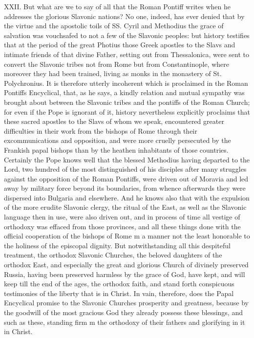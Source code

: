 XXII. But what are we to say of all that the Roman Pontiff writes when
he addresses the glorious Slavonic nations? No one, indeed, has ever
denied that by the virtue and the apostolic toils of SS. Cyril and
Methodius the grace of salvation was vouchsafed to not a few of the
Slavonic peoples: but history testifies that at the period of the great
Photius those Greek apostles to the Slavs and intimate friends of that
divine Father, setting out from Thessalonica, were sent to convert the
Slavonic tribes not from Rome but from Constantinople, where moreover
they had been trained, living as monks in the monastery of St.
Polychronius. It is therefore utterly incoherent which is proclaimed in
the Roman Pontiff\textquotesingle s Encyclical, that, as he says, a
kindly relation and mutual sympathy was brought about between the
Slavonic tribes and the pontiffs of the Roman Church; for even if the
Pope is ignorant of it, history nevertheless explicitly proclaims that
these sacred apostles to the Slavs of whom we speak, encountered greater
difficulties in their work from the bishops of Rome through their
excommunications and opposition, and were more cruelly persecuted by the
Frankish papal bishops than by the heathen inhabitants of those
countries. Certainly the Pope knows well that the blessed Methodius
having departed to the Lord, two hundred of the most distinguished of
his disciples\textquotesingle{} after many struggles against the
opposition of the Roman Pontiffs, were driven out of Moravia and led
away by military force beyond its boundaries, from whence afterwards
they were dispersed into Bulgaria and elsewhere. And he knows also that
with the expulsion of the more erudite Slavonic clergy, the ritual of
the East, as well as the Slavonic language then in use, were also driven
out, and in process of time all vestige of orthodoxy was effaced from
those provinces, and all these things done with the official cooperation
of the bishops of Rome m a manner not the least honorable to the
holiness of the episcopal dignity. But notwithstanding all this
despiteful treatment, the orthodox Slavonic Churches, the beloved
daughters of the orthodox East, and especially the great and glorious
Church of divinely preserved Russia, having been preserved harmless by
the grace of God, have kept, and will keep till the end of the ages, the
orthodox faith, and stand forth conspicuous testimonies of the liberty
that is in Christ. In vain, therefore, does the Papal Encyclical promise
to the Slavonic Churches prosperity and greatness, because by the
goodwill of the most gracious God they already possess these blessings,
and such as these, standing firm m the orthodoxy of their fathers and
glorifying in it in Christ.

